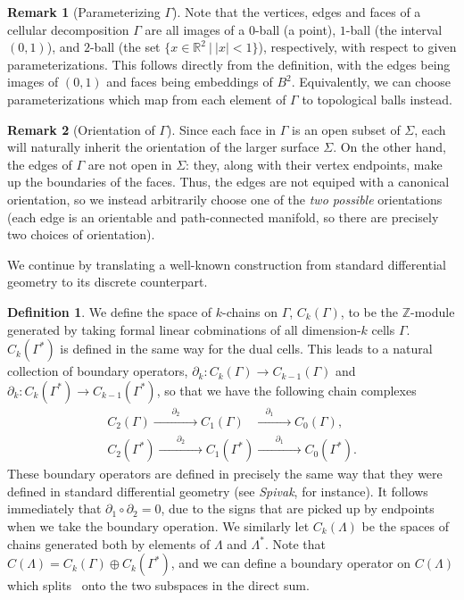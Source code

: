 \documentclass[aps,pra,showpacs,notitlepage,onecolumn,superscriptaddress,nofootinbib]{revtex4-1}
\theoremstyle{definition}
\newtheorem{definition}{Definition}[section]
\newtheorem{remark}{Remark}[section]
\begin{document}
\begin{remark}[Parameterizing $\Gamma$]
  Note that the vertices, edges and faces of a cellular decomposition $\Gamma$ are all images of a $0$-ball (a point), $1$-ball (the interval $(0, 1)$), and $2$-ball (the set $\{x \in \mathbb{R}^2 \ | \ |x| < 1\}$), respectively,
  with respect to given parameterizations. This follows directly from the definition, with the edges being images of $(0, 1)$ and faces being embeddings of $B^2$. Equivalently, we can choose parameterizations which map from each element
  of $\Gamma$ to topological balls instead.
\end{remark}

\begin{remark}[Orientation of $\Gamma$]
Since each face in $\Gamma$ is an open subset of $\Sigma$, each will naturally inherit the orientation of the larger surface $\Sigma$. On the other hand, the edges of $\Gamma$
are not open in $\Sigma$: they, along with their vertex endpoints, make up the boundaries of the faces. Thus, the edges are not equiped with a canonical orientation, so
we instead arbitrarily choose one of the \emph{two possible} orientations (each edge is an orientable and path-connected manifold, so there are precisely two choices of orientation).
\end{remark}

\noindent We continue by translating a well-known construction from standard differential geometry to its discrete counterpart.

\begin{definition}
  We define the space of $k$-chains on $\Gamma$, $C_k(\Gamma)$, to be the $\mathbb{Z}$-module generated by taking formal linear cobminations of all dimension-$k$ cells $\Gamma$.
  $C_k(\Gamma^{*})$ is defined in the same way for the dual cells.
  This leads to a natural collection of boundary operators, $\partial_k : C_k(\Gamma) \rightarrow C_{k - 1}(\Gamma)$ and $\partial_k : C_k(\Gamma^{*}) \rightarrow C_{k - 1}(\Gamma^{*})$, so that we have the following chain complexes
  \begin{align}
    C_2(\Gamma) \xrightarrow{\qquad \partial_2 \qquad} C_1(\Gamma) \xrightarrow{\qquad \partial_1 \qquad} C_0(\Gamma), \\
    C_2(\Gamma^{*}) \xrightarrow{\qquad \partial_2 \qquad} C_1(\Gamma^{*}) \xrightarrow{\qquad \partial_1 \qquad} C_0(\Gamma^{*}).
  \end{align}
  These boundary operators are defined in precisely the same way that they were defined in standard differential geometry (see \emph{Spivak}, for instance). It follows immediately that
  $\partial_1 \circ \partial_2 = 0$, due to the signs that are picked up by endpoints when we take the boundary operation. We similarly let $C_k(\Lambda)$ be the spaces of chains
  generated both by elements of $\Lambda$ and $\Lambda^{*}$. Note that $C(\Lambda) = C_k(\Gamma) \oplus C_k(\Gamma^{*})$, and we can define a boundary operator on $C(\Lambda)$ which splits \
  onto the two subspaces in the direct sum.
\end{definition}
\end{document}
